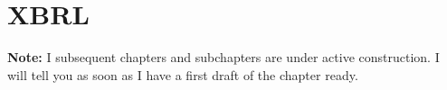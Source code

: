 \chapter{XBRL}
\label{chapter:xbrl}











\textbf{Note:} I subsequent chapters and subchapters are under active construction.
I will tell you as soon as I have a first draft of the chapter ready.
\cleardoublepage









